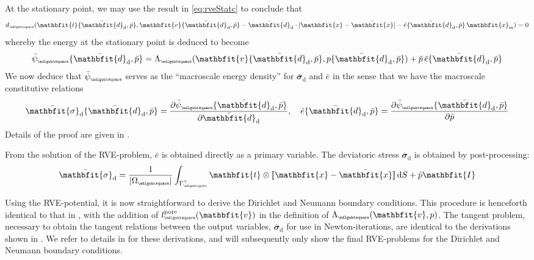 \documentclass[12pt,a4paper]{article}
\renewcommand{\ta}[1]{\mathbfit{#1}}
\renewcommand{\ts}[1]{\mathbfit{#1}}
\renewcommand{\Box}{\mdlgwhtsquare}
\DeclarePairedDelimiter{\jmp}{[\![}{]\!]}
\renewcommand{\dev}{\mathrm{d}}
\newcommand{\volume}{|\Omega_\rve|}
\newcommand{\pore}{\mathrm{pore}}
\newcommand{\epspargs}{\{{\bar{\ts d}}_\dev, \bar{p}\}}
\newcommand{\rve}{
  {\mathchoice
   {\mbox{\scalebox{0.67}{$\Box$}}}
   {\mbox{\scalebox{0.67}{$\Box$}}}
   {\mbox{\scalebox{0.5}{$\Box$}}}
   {\mbox{\scalebox{0.375}{$\Box$}}}
  }
}
\begin{document}
At the stationary point, we may use the result in \cref{eq:rveStatc} to conclude that
\begin{equation}
    d_\rve(\ta{t}\epspargs,\ta v\epspargs-\bar{\ts d}_\dev\cdot[\ta{x}-\bar{\ta{x}}]-\bar{e}\epspargs\,\ta{x}_\mean) = 0
\label{eq86}
\end{equation}
whereby the energy at the stationary point is deduced to become
\begin{equation}
    \bar{\psi}_\rve\epspargs =
    \Lambda_\rve(\ta v\epspargs,p\epspargs) + \bar{p}\,\bar{e}\epspargs
\label{eq87}
\end{equation}
We now deduce that $\bar{\psi}_\rve$ serves as the ``macroscale energy density'' for $\bar{\ts\sigma}_\dev$ and $\bar{e}$ in the sense that we have the macroscale constitutive relations
\begin{equation}
    \bar{\ts\sigma}_\dev\epspargs = \frac{\partial \bar{\psi}_\rve\epspargs}{\partial \bar{\ts d}_\dev}, \quad
     \bar{e}\epspargs = \frac{\partial \bar{\psi}_\rve\epspargs}{\partial \bar{p}}
\label{eq88}
\end{equation}
Details of the proof are given in \cite{ohman_variationally_2014}.

From the solution of the RVE-problem, $\bar{e}$ is obtained directly as a primary variable.
The deviatoric stress $\bar{\ts\sigma}_\dev$ is obtained by post-processing:
\begin{align}
 \bar{\ts\sigma}_\dev = \frac{1}{\volume} \int_{\Gamma_\rve^+} \ta t \outerp \jmp{\ta x - \bar{\ta x}}\dif S + \bar{p}\ts I
\label{eq:weak_periodic_sigma_dev}
\end{align}

Using the RVE-potential, it is now straightforward to derive the Dirichlet and Neumann boundary conditions.
This procedure is henceforth identical to that in \cite{ohman_variationally_2014}, with the addition of $l_\rve^\pore(\ta v)$ in the definition of $\Lambda_\rve(\ta v,p)$.
The tangent problem, necessary to obtain the tangent relations between the output variables, $\bar{\ts\sigma}_\dev$ for use in Newton-iterations, are identical to the derivations shown in \cite{ohman_variationally_2014}.
We refer to details in \cite{ohman_variationally_2014} for these derivations, and will subsequently only show the final RVE-problems for the Dirichlet and Neumann boundary conditions.
\end{document}
